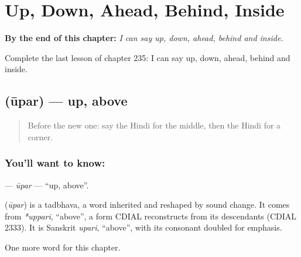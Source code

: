 
\chapter{Up, Down, Ahead, Behind, Inside}
\label{ch:hi-up-down-ahead-behind-inside}

\begin{chapteropening}
\textbf{By the end of this chapter:} \emph{I can say up, down, ahead, behind and inside.}

Complete the last lesson of chapter 235: I can say up, down, ahead, behind and inside.
\end{chapteropening}

\section[\texorpdfstring{\hi{ऊपर} (ūpar)}{ऊपर (ūpar)}]{ (ūpar) — up, above}

\label{lesson:HI-C235-upar}



\begin{quote}
Before the new one: say the Hindi for the middle, then the Hindi for a corner.
\end{quote}

\subsection*{You'll want to know: }
\textbf{} — \emph{ūpar} — \textquotedblleft{}up, above\textquotedblright{}.

\begin{cousinweb}
\textbf{} (\emph{ūpar}) is a tadbhava, a word inherited and reshaped by sound change. It comes from \emph{*uppari}, \textquotedblleft{}above\textquotedblright{}, a form CDIAL reconstructs from its descendants (CDIAL 2333). It is Sanskrit \emph{upari}, \textquotedblleft{}above\textquotedblright{}, with its consonant doubled for emphasis.
\end{cousinweb}

\begin{grammarlens}[title={What you've built}]
One more word for this chapter.
\end{grammarlens}

